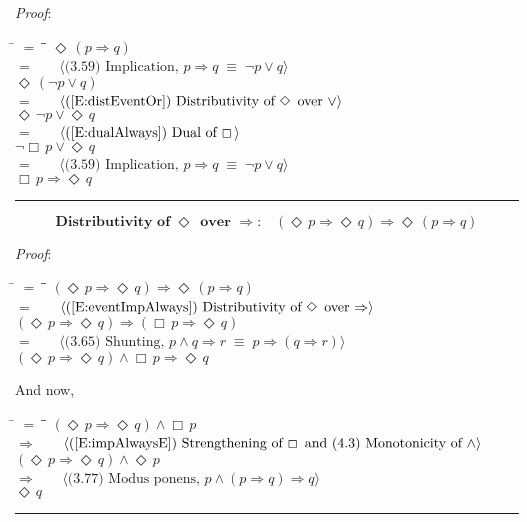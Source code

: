 \documentclass[12pt, fleqn, leqno]{article}
\newcommand{\lgap}{2pt}                             %
\newcommand{\mymathindent}{24pt}                    %
\newcommand{\equivs}{\ensuremath{\;\equiv\;}}       %
\newcommand{\impl}{\ensuremath{\Rightarrow}}        %
\newcommand{\Event}{\Diamond\,}
\newcommand{\Always}{\Box\,}
\newcommand{\myqed}{\rule[-.23ex]{1.2ex}{2.0ex}}
\newcommand{\myqedtab}{\hspace{384pt}}              %
\newcommand{\Gll} {\langle}                         %
\newcommand{\Ggg} {\rangle}                         %
\newcommand{\Hint}[1]     {\ \ \ $\Gll              \mbox{#1} \Ggg$ }   %
\begin{document}
\emph{Proof}:
\begin{tabbing}
\hspace{\mymathindent} \= $= \;$ \= \myqedtab \= \kill
  \> \>   $\Event(p \impl q)$\\[\lgap]
  \> $=$  \>  \Hint{(3.59) Implication, $p\impl q \equivs \neg p \lor q$}\\[\lgap]
  \> \>   $\Event(\neg p \lor q)$\\[\lgap]
  \> $=$  \>  \Hint{(\ref{E:distEventOr}) Distributivity of $\Event$ over $\lor$}\\[\lgap]
  \> \>   $\Event\neg p \lor \Event q$\\[\lgap]
  \> $=$  \>  \Hint{(\ref{E:dualAlways}) Dual of $\Always$}\\[\lgap]
  \> \>   $\neg\Always p \lor \Event q$\\[\lgap]
  \> $=$  \>  \Hint{(3.59) Implication, $p\impl q \equivs \neg p \lor q$}\\[\lgap]
  \> \>   $\Always p \impl \Event q$ \quad \myqed
\end{tabbing}
\begin{equation}\label{E:eventPImplEventQ}
\textbf{Distributivity of $\Event$ over $\impl$:}\quad (\Event p \impl \Event q) \impl \Event (p \impl q)
\end{equation}

\emph{Proof}:
\begin{tabbing}
\hspace{\mymathindent} \= $= \;$ \= \myqedtab \= \kill
  \> \>   $(\Event p \impl \Event q) \impl \Event (p \impl q)$\\[\lgap]
   \> $=$  \>  \Hint{(\ref{E:eventImpAlways}) Distributivity of $\Event$ over $\impl$}\\[\lgap]
  \> \>   $(\Event p \impl \Event q) \impl (\Always p \impl \Event q)$\\[\lgap]
  \> $=$  \>  \Hint{(3.65) Shunting, $p\land q\impl r\equivs p\impl (q\impl r)$}\\[\lgap]
  \> \>   $(\Event p \impl \Event q) \land \Always p \impl \Event q$
\end{tabbing}
And now,
\begin{tabbing}
\hspace{\mymathindent} \= $= \;$ \= \myqedtab \= \kill
  \> \>   $(\Event p \impl \Event q) \land \Always p$\\[\lgap]
  \> $\impl$  \>  \Hint{(\ref{E:impAlwaysE}) Strengthening of $\Always$ and (4.3) Monotonicity of $\land$}\\[\lgap]
  \> \>   $(\Event p \impl \Event q) \land \Event p$\\[\lgap]
   \> $\impl$  \>  \Hint{(3.77) Modus ponens, $p\land (p\impl q)\impl q$}\\[\lgap]
  \> \>   $ \Event q$ \quad \myqed
\end{tabbing}
\end{document}
